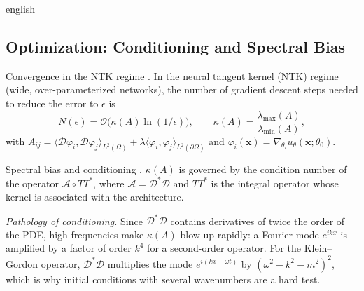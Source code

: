 \documentclass[../0000.tex]{subfiles}
\begin{document}
\begin{hyphenrules}{english}
\subsection{Optimization: Conditioning and Spectral Bias}

\begin{teorema}{Convergence in the NTK regime \cite[Theorem~7.9]{deryck2024operator}.}\label{thm:ntk-conv}
In the neural tangent kernel (NTK) regime (wide, over-parameterized networks), the number of gradient
descent steps needed to reduce the error to $\epsilon$ is
\[
  N(\epsilon)=\mathcal{O}\big(\kappa(A)\ln(1/\epsilon)\big),\qquad\kappa(A)=\frac{\lambda_{\max}(A)}{\lambda_{\min}(A)},
\]
with
$A_{ij}=\langle\mathcal{D}\varphi_i,\mathcal{D}\varphi_j\rangle_{L^2(\Omega)}+\lambda\langle\varphi_i,\varphi_j\rangle_{L^2(\partial\Omega)}$
and $\varphi_i(\mathbf{x})=\nabla_{\theta_i}u_\theta(\mathbf{x};\theta_0)$.
\end{teorema}

\begin{teorema}{Spectral bias and conditioning \cite[Theorem~7.10]{deryck2024operator}.}\label{thm:spectral-bias}
$\kappa(A)$ is governed by the condition number of the operator $\mathcal{A}\circ TT^{*}$, where
$\mathcal{A}=\mathcal{D}^{*}\mathcal{D}$ and $TT^{*}$ is the integral operator whose kernel is associated
with the architecture.
\end{teorema}

\emph{Pathology of conditioning.} Since $\mathcal{D}^{*}\mathcal{D}$ contains derivatives of twice the
order of the PDE, high frequencies make $\kappa(A)$ blow up rapidly: a Fourier mode $e^{ikx}$ is
amplified by a factor of order $k^{4}$ for a second-order operator. For the Klein--Gordon operator,
$\mathcal{D}^{*}\mathcal{D}$ multiplies the mode $e^{i(kx-\omega t)}$ by $(\omega^2-k^2-m^2)^2$, which
is why initial conditions with several wavenumbers are a hard test.


\end{hyphenrules}
\end{document}
